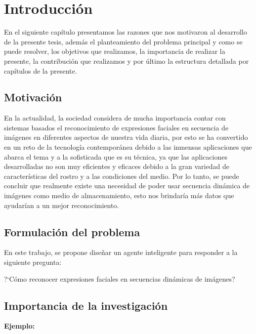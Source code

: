 \chapter{Introducción}
\setcounter{page}{1}
En el siguiente capítulo presentamos las razones que nos motivaron al desarrollo de la presente tesis, además el planteamiento del problema principal y como se puede resolver, los objetivos que realizamos, la importancia de realizar la presente, la contribución que realizamos y por último la estructura detallada por capítulos de la presente.

\vskip 0.3cm  

\section{Motivación}

En la actualidad, la sociedad considera de mucha importancia contar con sistemas basados el reconocimiento de expresiones faciales en secuencia de imágenes en diferentes aspectos de nuestra vida diaria, por esto se ha convertido en un reto de la tecnología contemporánea debido a las inmensas aplicaciones que abarca el tema y a la sofisticada que es su técnica, ya que las aplicaciones desarrolladas no son muy eficientes y eficaces debido a la gran variedad de características del rostro y a las condiciones del medio.
\vskip 0.3cm
 Por lo tanto, se puede concluir que realmente existe una necesidad de poder usar secuencia dinámica de imágenes como medio de almacenamiento, esto nos brindaría más datos que ayudarían a un mejor reconocimiento.


\section{Formulación del problema}

  En este trabajo, se propone diseñar un agente inteligente para responder a la siguiente pregunta:
 \begin{center} 
     ?`Cómo reconocer expresiones faciales en secuencias dinámicas de imágenes?
 \end{center}

\section{Importancia de la investigación} 

{\bf Ejemplo:}\par


